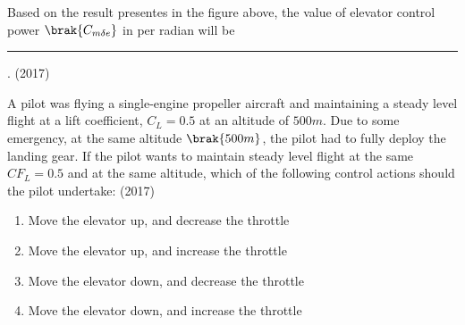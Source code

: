  
 Based on the result presentes in the figure above, the value of elevator control power $\brak{C_{m\delta e}}$ in per radian will be \rule{1cm}{0.15mm} .
 \hfill{(2017)}
    \item A pilot was flying a single-engine propeller aircraft and maintaining a steady level flight at a lift coefficient, $C_L=0.5$ at an altitude of $500m$. Due to some emergency, at the same altitude $\brak{500m}$, the pilot had to fully deploy the landing gear. If the pilot wants to maintain steady level flight at the same $CF_L =0.5$ and at the same altitude, which of the following control actions should the pilot undertake:
    \hfill{(2017)}
    \begin{enumerate}
        \item Move the elevator up, and decrease the throttle
        \item Move the elevator up, and increase the throttle 
        \item Move the elevator down, and decrease the throttle 
        \item Move the elevator down, and increase the throttle
        
    \end{enumerate}

